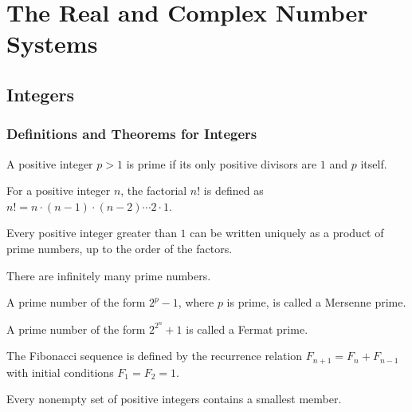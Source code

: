 \chapter{The Real and Complex Number Systems}

\section{Integers}

\subsection*{Definitions and Theorems for Integers}

\begin{definition}
A positive integer $p > 1$ is prime if its only positive divisors are $1$ and $p$ itself.
\end{definition}

\begin{definition}[Factorial]
For a positive integer $n$, the factorial $n!$ is defined as $n! = n \cdot (n-1) \cdot (n-2) \cdots 2 \cdot 1$.
\end{definition}

\begin{theorem}
Every positive integer greater than $1$ can be written uniquely as a product of prime numbers, up to the order of the factors.
\end{theorem}

\begin{theorem}
There are infinitely many prime numbers.
\end{theorem}

\begin{definition}
A prime number of the form $2^p - 1$, where $p$ is prime, is called a Mersenne prime.
\end{definition}

\begin{definition}
A prime number of the form $2^{2^n} + 1$ is called a Fermat prime.
\end{definition}

\begin{definition}
The Fibonacci sequence is defined by the recurrence relation $F_{n+1} = F_n + F_{n-1}$ with initial conditions $F_1 = F_2 = 1$.
\end{definition}

\begin{theorem}
Every nonempty set of positive integers contains a smallest member.
\end{theorem}

